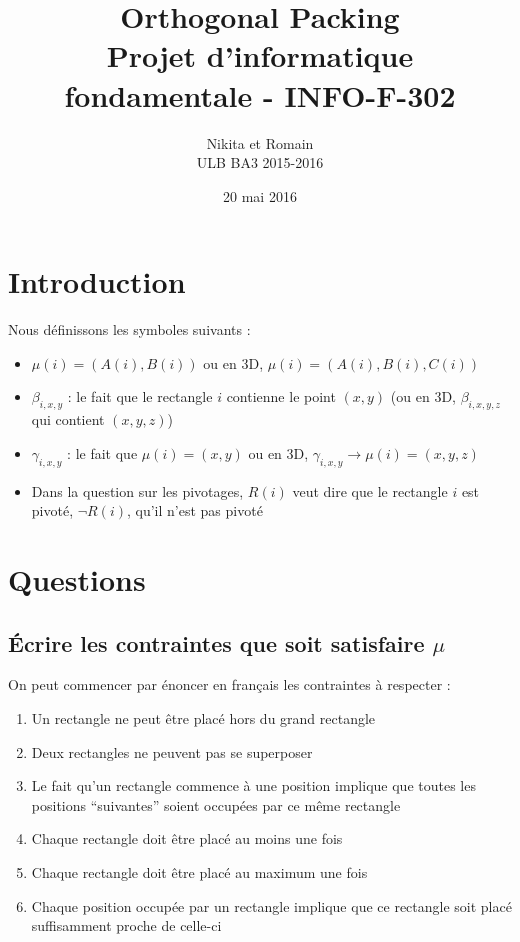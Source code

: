 \documentclass[a4paper]{article}
\title{
    Orthogonal Packing\\
    \small Projet d'informatique fondamentale - INFO-F-302
}
\author{
    Nikita \bsc{Marchant} et Romain \bsc{Fontaine}\\
    ULB BA3 2015-2016
}
\date{20 mai 2016}
\begin{document}
\maketitle
\tableofcontents

\section{Introduction}

Nous définissons les symboles suivants :
\begin{itemize}
  \item $\mu(i) = (A(i), B(i))$ ou en 3D, $\mu(i) = (A(i), B(i), C(i))$
  \item $\beta_{i, x, y}$ : le fait que le rectangle $i$ contienne le point $(x, y)$ (ou en 3D, $\beta_{i, x, y, z}$ qui contient $(x, y, z)$)
  \item $\gamma_{i, x, y}$ : le fait que $\mu(i) = (x, y)$ ou en 3D, $\gamma_{i, x, y} \rightarrow \mu(i) = (x, y, z)$
  \item Dans la question sur les pivotages, $R(i)$ veut dire que le rectangle $i$ est pivoté, $\lnot R(i)$, qu'il n'est pas pivoté
\end{itemize}

\section{Questions}
\subsection{Écrire les contraintes que soit satisfaire $\mu$}

On peut commencer par énoncer en français les contraintes à respecter :
\begin{enumerate}
  \item Un rectangle ne peut être placé hors du grand rectangle
  \item Deux rectangles ne peuvent pas se superposer
  \item Le fait qu'un rectangle commence à une position implique que toutes les positions ``suivantes'' soient occupées par ce même rectangle
  \item Chaque rectangle doit être placé au moins une fois
  \item Chaque rectangle doit être placé au maximum une fois
  \item Chaque position occupée par un rectangle implique que ce rectangle soit placé suffisamment proche de celle-ci
\end{enumerate}
\vspace{1em}
\end{document}
